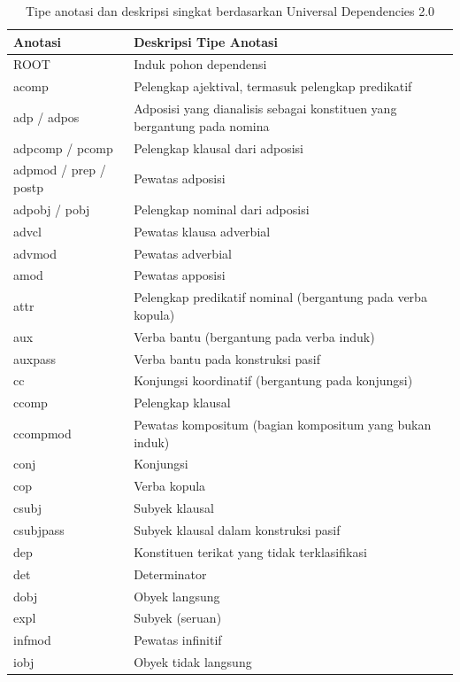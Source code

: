 \begin{center}
\begin{small}
\begin{longtable}{| p{} | p{} |} 
\caption{Tipe anotasi dan deskripsi singkat berdasarkan Universal Dependencies 2.0 \citep{nivre2006maltparser}} \label{tab:tipe_anotasi}
    \hline
Anotasi & Deskripsi Tipe Anotasi \\ \hline
ROOT & Induk pohon dependensi \\ \hline
acomp & Pelengkap ajektival, termasuk pelengkap predikatif \\ \hline
adp / adpos & Adposisi yang dianalisis sebagai konstituen yang bergantung pada nomina \\ \hline
adpcomp / pcomp & Pelengkap klausal dari adposisi \\ \hline
adpmod / prep / postp & Pewatas adposisi \\ \hline
adpobj / pobj & Pelengkap nominal dari adposisi \\ \hline
advcl & Pewatas klausa adverbial \\ \hline
advmod & Pewatas adverbial \\ \hline
amod & Pewatas apposisi \\ \hline
attr & Pelengkap predikatif nominal (bergantung pada verba kopula) \\ \hline
aux & Verba bantu (bergantung pada verba induk) \\ \hline
auxpass & Verba bantu pada konstruksi pasif \\ \hline
cc & Konjungsi koordinatif (bergantung pada konjungsi) \\ \hline
ccomp & Pelengkap klausal \\ \hline
ccompmod & Pewatas kompositum (bagian kompositum yang bukan induk) \\ \hline
conj & Konjungsi \\ \hline
cop & Verba kopula \\ \hline
csubj & Subyek klausal \\ \hline
csubjpass & Subyek klausal dalam konstruksi pasif \\ \hline
dep & Konstituen terikat yang tidak terklasifikasi \\ \hline
det & Determinator \\ \hline
dobj & Obyek langsung \\ \hline
expl & Subyek (seruan) \\ \hline
infmod & Pewatas infinitif \\ \hline
iobj & Obyek tidak langsung \\ \hline

\end{longtable}
\end{small}
\end{center}
